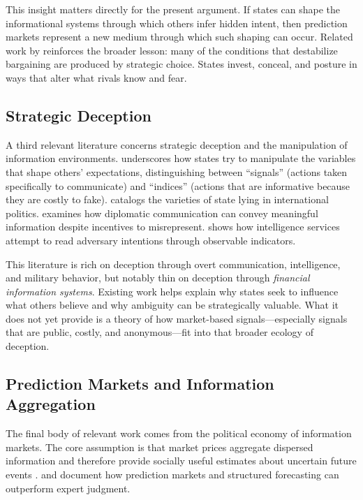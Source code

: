 \documentclass[12pt]{article}
\begin{document}
This insight matters directly for the present argument. If states can shape the informational systems through which others infer hidden intent, then prediction markets represent a new medium through which such shaping can occur. Related work by \citet{debsmonteiro2014} reinforces the broader lesson: many of the conditions that destabilize bargaining are produced by strategic choice. States invest, conceal, and posture in ways that alter what rivals know and fear.

\subsection{Strategic Deception}

A third relevant literature concerns strategic deception and the manipulation of information environments. \citet{jervis1970, jervis1976} underscores how states try to manipulate the variables that shape others' expectations, distinguishing between ``signals'' (actions taken specifically to communicate) and ``indices'' (actions that are informative because they are costly to fake). \citet{mearsheimer2011} catalogs the varieties of state lying in international politics. \citet{trager2017} examines how diplomatic communication can convey meaningful information despite incentives to misrepresent. \citet{yarhimilo2014} shows how intelligence services attempt to read adversary intentions through observable indicators.

This literature is rich on deception through overt communication, intelligence, and military behavior, but notably thin on deception through \textit{financial information systems}. Existing work helps explain why states seek to influence what others believe and why ambiguity can be strategically valuable. What it does not yet provide is a theory of how market-based signals---especially signals that are public, costly, and anonymous---fit into that broader ecology of deception.

\subsection{Prediction Markets and Information Aggregation}

The final body of relevant work comes from the political economy of information markets. The core assumption is that market prices aggregate dispersed information and therefore provide socially useful estimates about uncertain future events \citep{wolferszitzewitz2004, arrow2008}. \citet{tetlock2005} and \citet{tetlockgardner2015} document how prediction markets and structured forecasting can outperform expert judgment.
\end{document}
